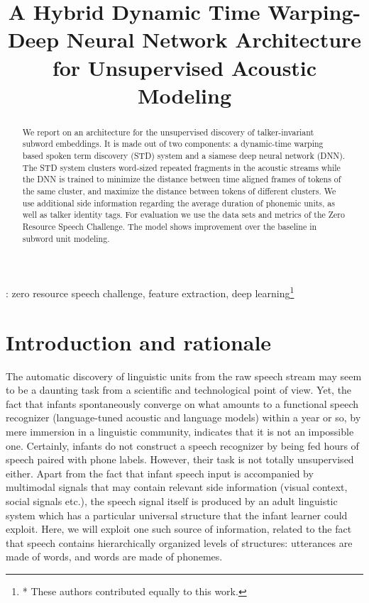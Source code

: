 \documentclass[a4paper]{article}
\title{A Hybrid Dynamic Time Warping-Deep Neural Network Architecture for Unsupervised Acoustic Modeling}
\begin{document}
\maketitle

\begin{abstract}
We report on an architecture for the unsupervised discovery of talker-invariant subword embeddings. It is made out of two components: a dynamic-time warping based spoken term discovery (STD) system and a siamese deep neural network (DNN). The STD system clusters word-sized repeated fragments in the acoustic streams while the DNN is trained to minimize the distance between time aligned frames of tokens of the same cluster, and maximize the distance between tokens of different clusters. We use additional side information regarding the average duration of phonemic units, as well as talker identity tags. For evaluation we use the data sets and metrics of the Zero Resource Speech Challenge. The model shows improvement over the baseline in subword unit modeling. 
\end{abstract}
: zero resource speech challenge, feature extraction, deep learning\let\thefootnote\relax\footnote{* These authors contributed equally to this work.}


\section{Introduction and rationale}
The automatic discovery of linguistic units from the raw speech stream \cite{XXX} may seem to be a daunting task from a scientific and technological point of view. Yet, the fact that infants spontaneously converge on what amounts to a functional speech recognizer (language-tuned acoustic and language models) within a year or so, by mere immersion in a linguistic community, indicates that it is not an impossible one. Certainly, infants do not construct a speech recognizer by being fed hours of speech paired with phone labels. However, their task is not totally unsupervised either. Apart from the fact that infant speech input is accompanied by multimodal signals that may contain relevant side information (visual context, social signals etc.), the speech signal itself is produced by an adult linguistic system which has a particular universal structure that the infant learner could exploit. Here, we will exploit one such source of information, related to the fact that speech contains hierarchically organized levels of structures: utterances are made of words, and words are made of phonemes. 
\end{document}
